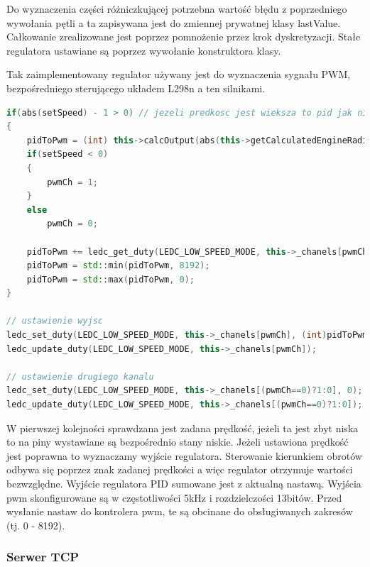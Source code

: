 Do wyznaczenia części różniczkującej potrzebna wartość błędu z poprzedniego wywołania pętli a ta zapisywana jest do zmiennej prywatnej klasy lastValue. 
Całkowanie zrealizowane jest poprzez pomnożenie przez krok dyskretyzacji. Stałe regulatora ustawiane są poprzez wywołanie konstruktora klasy.

Tak zaimplementowany regulator używany jest do wyznaczenia sygnału PWM, bezpośredniego sterującego układem L298n a ten silnikami. 

\begin{lstlisting}[language=C++,caption=Wyznaczenie modulacji PWM,label={kodCPPPWM}]
if(abs(setSpeed) - 1 > 0) // jezeli predkosc jest wieksza to pid jak nie to hamulec bo pwm=0
{
	pidToPwm = (int) this->calcOutput(abs(this->getCalculatedEngineRadialSpeed()), abs(setSpeed));
	if(setSpeed < 0)
	{
		pwmCh = 1;
	}
	else
		pwmCh = 0;

	pidToPwm += ledc_get_duty(LEDC_LOW_SPEED_MODE, this->_chanels[pwmCh]);
	pidToPwm = std::min(pidToPwm, 8192);
	pidToPwm = std::max(pidToPwm, 0);
}

// ustawienie wyjsc
ledc_set_duty(LEDC_LOW_SPEED_MODE, this->_chanels[pwmCh], (int)pidToPwm);
ledc_update_duty(LEDC_LOW_SPEED_MODE, this->_chanels[pwmCh]);

// ustawienie drugiego kanalu
ledc_set_duty(LEDC_LOW_SPEED_MODE, this->_chanels[(pwmCh==0)?1:0], 0);
ledc_update_duty(LEDC_LOW_SPEED_MODE, this->_chanels[(pwmCh==0)?1:0]);
\end{lstlisting}

W pierwszej kolejności sprawdzana jest zadana prędkość, jeżeli ta jest zbyt niska to na piny wystawiane są bezpośrednio stany niskie.
Jeżeli ustawiona prędkość jest poprawna to wyznaczamy wyjście regulatora. Sterowanie kierunkiem obrotów odbywa 
się poprzez znak zadanej prędkości a więc regulator otrzymuje wartości bezwzględne. 
Wyjście regulatora PID sumowane jest z aktualną nastawą. Wyjścia pwm skonfigurowane są w częstotliwości 5kHz i rozdzielczości 13bitów. 
Przed wysłanie nastaw do kontrolera pwm, te są obcinane do obsługiwanych zakresów (tj. 0 - 8192).

\subsubsection{Serwer TCP}

